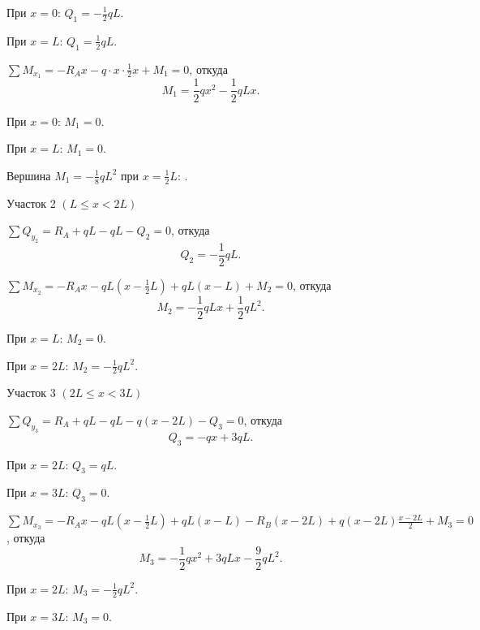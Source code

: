 При $x = 0$: $Q_1 = -\frac{1}{2}qL$.

При $x = L$: $Q_1 = \frac{1}{2}qL$.

$\sum M_{x_1} = -R_A x - q \cdot x \cdot \frac{1}{2} x + M_1 = 0$,
откуда
\[
    M_1 = \frac{1}{2} qx^2 - \frac{1}{2} qL x.
\]

При $x = 0$: $M_1 = 0$.

При $x = L$: $M_1 = 0$.

Вершина $M_1 = -\frac{1}{8}qL^2$ при $x = \frac{1}{2} L$: .

Участок 2 $\left(L \le x < 2L\right)$

$\sum Q_{y_2} = R_A + qL - qL - Q_2 = 0$,
откуда
\[
    Q_2 = -\frac{1}{2} qL.
\]

$\sum M_{x_2} = -R_A x - q L (x - \frac{1}{2} L) + qL (x - L) + M_2 = 0$,
откуда
\[
    M_2 = -\frac{1}{2} qLx + \frac{1}{2} qL^2.
\]

При $x = L$: $M_2 = 0$.

При $x = 2L$: $M_2 = -\frac{1}{2}qL^2$.

Участок 3 $\left(2L \le x < 3L\right)$

$\sum Q_{y_3} = R_A + qL - qL - q(x - 2L) - Q_3 = 0$,
откуда
\[
    Q_3 = -qx + 3qL.
\]

При $x = 2L$: $Q_3 = qL$.

При $x = 3L$: $Q_3 = 0$.

$\sum M_{x_3} = -R_A x - q L (x - \frac{1}{2} L) + qL (x - L) - R_B (x - 2L) + q (x - 2L) \frac{x-2L}{2} + M_3 = 0$,
откуда 
\[
    M_3 = -\frac{1}{2} qx^2 + 3qLx - \frac{9}{2} qL^2.
\]

При $x = 2L$: $M_3 = -\frac{1}{2}qL^2$.

При $x = 3L$: $M_3 = 0$.

